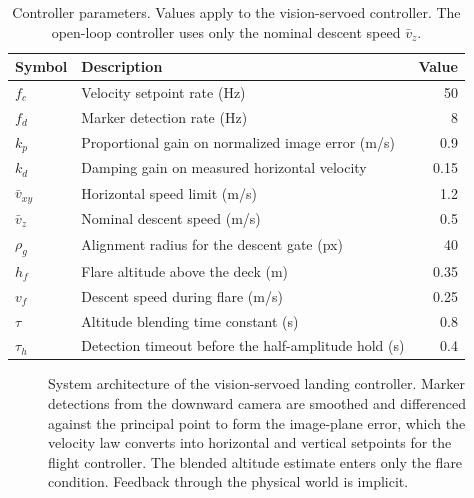 \begin{table}[!t]
\caption{Controller parameters. Values apply to the vision-servoed controller. The
open-loop controller uses only the nominal descent speed $\bar{v}_{z}$.}
\label{tab:params}
\centering
\footnotesize
\setlength{\tabcolsep}{3pt}
\begin{tabular}{llr}
\toprule
Symbol & Description & Value \\
\midrule
$f_{c}$        & Velocity setpoint rate (Hz)                          & 50 \\
$f_{d}$        & Marker detection rate (Hz)                           & 8 \\
$k_{p}$        & Proportional gain on normalized image error (m/s)    & 0.9 \\
$k_{d}$        & Damping gain on measured horizontal velocity         & 0.15 \\
$\bar{v}_{xy}$ & Horizontal speed limit (m/s)                         & 1.2 \\
$\bar{v}_{z}$  & Nominal descent speed (m/s)                          & 0.5 \\
$\rho_{g}$     & Alignment radius for the descent gate (px)           & 40 \\
$h_{f}$        & Flare altitude above the deck (m)                    & 0.35 \\
$v_{f}$        & Descent speed during flare (m/s)                     & 0.25 \\
$\tau$         & Altitude blending time constant (s)                  & 0.8 \\
$\tau_{h}$     & Detection timeout before the half-amplitude hold (s) & 0.4 \\
\bottomrule
\end{tabular}
\end{table}

\begin{figure}[!t]
\centering
\caption{System architecture of the vision-servoed landing controller. Marker detections
from the downward camera are smoothed and differenced against the principal point to form
the image-plane error, which the velocity law converts into horizontal and vertical
setpoints for the flight controller. The blended altitude estimate enters only the flare
condition. Feedback through the physical world is implicit.}
\label{fig:block}
\end{figure}

